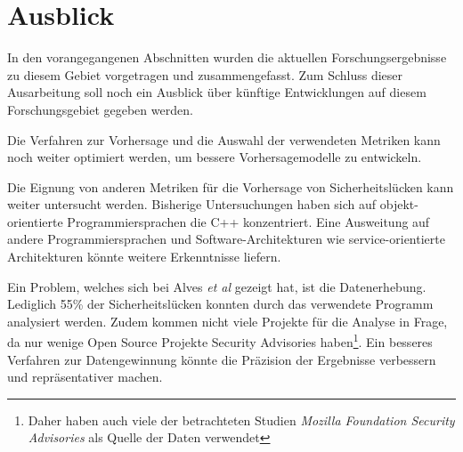 \section{Ausblick}
\label{sec:ausblick}
In den vorangegangenen Abschnitten wurden die aktuellen Forschungsergebnisse zu diesem Gebiet vorgetragen und zusammengefasst.
Zum Schluss dieser Ausarbeitung soll noch ein Ausblick über künftige Entwicklungen auf diesem Forschungsgebiet gegeben werden.

Die Verfahren zur Vorhersage und die Auswahl der verwendeten Metriken kann noch weiter optimiert werden, um bessere Vorhersagemodelle zu entwickeln.

Die Eignung von anderen Metriken für die Vorhersage von Sicherheitslücken kann weiter untersucht werden.
Bisherige Untersuchungen haben sich auf objekt-orientierte Programmiersprachen die C++ konzentriert.
Eine Ausweitung auf andere Programmiersprachen und Software-Architekturen wie service-orientierte Architekturen könnte weitere Erkenntnisse liefern\cite{chowdhury_zulkernine_2009}.

Ein Problem, welches sich bei Alves \emph{et al} \cite{alves_et_al} gezeigt hat, ist die Datenerhebung.
Lediglich 55\% der Sicherheitslücken konnten durch das verwendete Programm analysiert werden.
Zudem kommen nicht viele Projekte für die Analyse in Frage, da nur wenige Open Source Projekte Security Advisories haben\footnote{Daher haben auch viele der betrachteten Studien \emph{Mozilla Foundation Security Advisories} als Quelle der Daten verwendet}.
Ein besseres Verfahren zur Datengewinnung könnte die Präzision der Ergebnisse verbessern und repräsentativer machen.
